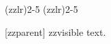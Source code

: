 \DeclareMathOperator*{\zzopname}{zzopbody}
\cmidrule(zzlr){2-5}
\cmidrule[zzwidth](zzlr){2-5}
\usepackage[zzoptb]{zzpkgb}
[zzparent]
\addlinespace[zzspace]
zzvisible text.
